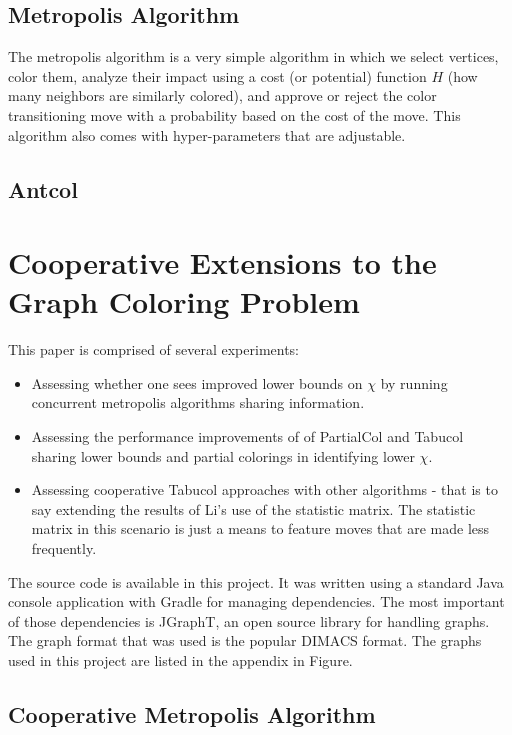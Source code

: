 \documentclass[runningheads]{llncs}
\begin{document}
\subsection{Metropolis Algorithm}
The metropolis algorithm is a very simple algorithm in which we select vertices, color them, analyze their impact using a cost (or potential) function $H$ (how many neighbors are similarly colored), and approve or reject the color transitioning move with a probability based on the cost of the move. This algorithm also comes with hyper-parameters that are adjustable.

\subsection{Antcol}


\section{Cooperative Extensions to the Graph Coloring Problem}

This paper is comprised of several experiments:

\begin{itemize}

  \item Assessing whether one sees improved lower bounds on $\chi$ by running concurrent metropolis algorithms sharing information. 
  \item Assessing the performance improvements of of PartialCol and Tabucol sharing lower bounds and partial colorings in identifying lower $\chi$.
    \item Assessing cooperative Tabucol approaches with other algorithms - that is to say extending the results of Li's use of the statistic matrix. \cite{https://doi.org/10.5445/ir/1000083192} The statistic matrix in this scenario is just a means to feature moves that are made less frequently.
\end{itemize}

The source code is available in this project. It was written using a standard Java console application with Gradle for managing dependencies. The most important of those dependencies is JGraphT, an open source library for handling graphs. The graph format that was used is the popular DIMACS format. The graphs used in this project are listed in the appendix in Figure. 

\subsection{Cooperative Metropolis Algorithm}
\end{document}

